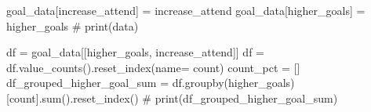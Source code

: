 \documentclass[
  letterpaper,
  DIV=11,
  numbers=noendperiod]{scrartcl}
\newenvironment{Shaded}{\begin{snugshade}}{\end{snugshade}}
\newcommand{\BuiltInTok}[1]{\textcolor[rgb]{0.00,0.23,0.31}{#1}}
\newcommand{\CommentTok}[1]{\textcolor[rgb]{0.37,0.37,0.37}{#1}}
\newcommand{\NormalTok}[1]{\textcolor[rgb]{0.00,0.23,0.31}{#1}}
\newcommand{\OperatorTok}[1]{\textcolor[rgb]{0.37,0.37,0.37}{#1}}
\newcommand{\StringTok}[1]{\textcolor[rgb]{0.13,0.47,0.30}{#1}}
\begin{document}
\begin{Shaded}
\begin{Highlighting}[]
\NormalTok{goal\_data[}\StringTok{\textquotesingle{}increase\_attend\textquotesingle{}}\NormalTok{] }\OperatorTok{=}\NormalTok{ increase\_attend}
\NormalTok{goal\_data[}\StringTok{\textquotesingle{}higher\_goals\textquotesingle{}}\NormalTok{] }\OperatorTok{=}\NormalTok{ higher\_goals}
\CommentTok{\# print(data)}

\NormalTok{df }\OperatorTok{=}\NormalTok{ goal\_data[[}\StringTok{\textquotesingle{}higher\_goals\textquotesingle{}}\NormalTok{, }\StringTok{\textquotesingle{}increase\_attend\textquotesingle{}}\NormalTok{]]}
\NormalTok{df }\OperatorTok{=}\NormalTok{ df.value\_counts().reset\_index(name}\OperatorTok{=} \StringTok{\textquotesingle{}count\textquotesingle{}}\NormalTok{)}
\NormalTok{count\_pct }\OperatorTok{=}\NormalTok{ []}
\NormalTok{df\_grouped\_higher\_goal\_sum }\OperatorTok{=}\NormalTok{ df.groupby(}\StringTok{\textquotesingle{}higher\_goals\textquotesingle{}}\NormalTok{)[}\StringTok{\textquotesingle{}count\textquotesingle{}}\NormalTok{].}\BuiltInTok{sum}\NormalTok{().reset\_index()}
\CommentTok{\# print(df\_grouped\_higher\_goal\_sum)}



\end{Highlighting}
\end{Shaded}
\end{document}
